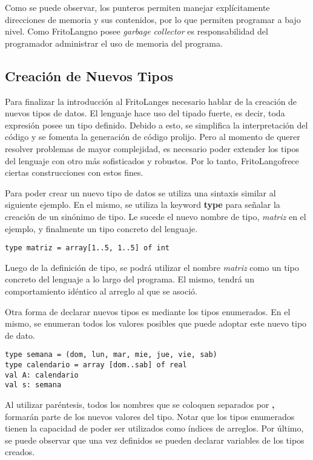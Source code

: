 \documentclass{article}
\newcommand{\Lang}{FritoLang} %
\begin{document}
Como se puede observar, los punteros permiten manejar explícitamente direcciones de memoria y sus contenidos, por lo que permiten programar a bajo nivel.
Como \Lang\space no posee \textit{garbage collector} es responsabilidad del programador administrar el uso de memoria del programa.

\subsection{Creación de Nuevos Tipos}
Para finalizar la introducción al \Lang\space es necesario hablar de la creación de nuevos tipos de datos.
El lenguaje hace uso del tipado fuerte, es decir, toda expresión posee un tipo definido.
Debido a esto, se simplifica la interpretación del código y se fomenta la generación de código prolijo.
Pero al momento de querer resolver problemas de mayor complejidad, es necesario poder extender los tipos del lenguaje con otro más sofisticados y robustos.
Por lo tanto, \Lang\space ofrece ciertas construcciones con estos fines.

Para poder crear un nuevo tipo de datos se utiliza una sintaxis similar al siguiente ejemplo.
En el mismo, se utiliza la keyword \textbf{type} para señalar la creación de un sinónimo de tipo.
Le sucede el nuevo nombre de tipo, \textit{matriz} en el ejemplo, y finalmente un tipo concreto del lenguaje.

\begin{lstlisting}
type matriz = array[1..5, 1..5] of int
\end{lstlisting}

Luego de la definición de tipo, se podrá utilizar el nombre \textit{matriz} como un tipo concreto del lenguaje a lo largo del programa. 
El mismo, tendrá un comportamiento idéntico al arreglo al que se asoció.

Otra forma de declarar nuevos tipos es mediante los tipos enumerados.
En el mismo, se enumeran todos los valores posibles que puede adoptar este nuevo tipo de dato.

\begin{lstlisting}
type semana = (dom, lun, mar, mie, jue, vie, sab)
type calendario = array [dom..sab] of real
val A: calendario
val s: semana
\end{lstlisting}

Al utilizar paréntesis, todos los nombres que se coloquen separados por \textbf{,} formarán parte de los nuevos valores del tipo.
Notar que los tipos enumerados tienen la capacidad de poder ser utilizados como índices de arreglos.
Por último, se puede observar que una vez definidos se pueden declarar variables de los tipos creados.
\end{document}
